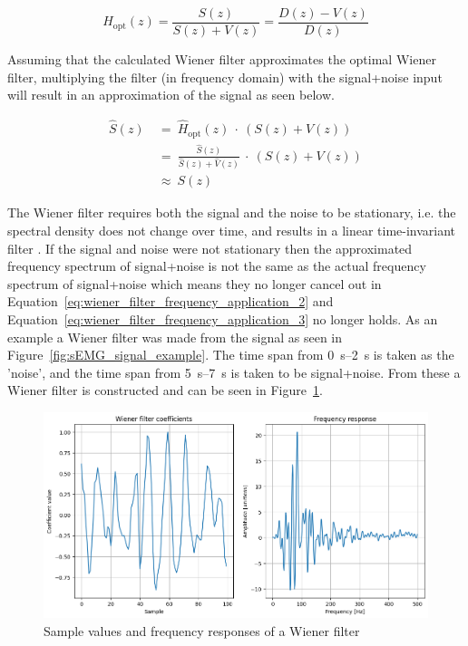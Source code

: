 \begin{equation}
    H_\text{opt}(z) = \frac{S(z)}{S(z) + V(z)} = \frac{D(z) - V(z)}{D(z)} 
    \label{eq:wiener_filter_frequency_behaviour}
\end{equation}

Assuming that the calculated Wiener filter approximates the optimal Wiener filter, multiplying the filter (in frequency domain) with the signal+noise input will result in an approximation of the signal as seen below.

\begin{align}
    \hat{S}(z) & \ = \ \hat{H}_\text{opt}(z) \ \cdot \ \left(S(z) + V(z)\right) \label{eq:wiener_filter_frequency_application_1} \\
    & \ = \ \frac{\hat{S}(z)}{\hat{S}(z) + \hat{V}(z)} \ \cdot \ \left(S(z) + V(z)\right) \label{eq:wiener_filter_frequency_application_2}\\
    & \ \approx \ S(z) \label{eq:wiener_filter_frequency_application_3}
\end{align}

The Wiener filter requires both the signal and the noise to be stationary, i.e. the spectral density does not change over time, and results in a linear time-invariant filter \cite{stationary_processes_definition} \cite{difference_stationary_nonstationary}. If the signal and noise were not stationary then the approximated frequency spectrum of signal+noise is not the same as the actual frequency spectrum of signal+noise which means they no longer cancel out in Equation~\ref{eq:wiener_filter_frequency_application_2} and Equation~\ref{eq:wiener_filter_frequency_application_3} no longer holds.
As an example a Wiener filter was made from the signal as seen in Figure~\ref{fig:sEMG_signal_example}. The time span from \SIrange{0}{2}{\second} is taken as the 'noise', and the time span from \SIrange{5}{7}{\second} is taken to be signal+noise. From these a Wiener filter is constructed and can be seen in Figure~\ref{fig:wiener_filter_response}.

\begin{figure}[h!t]
	\begin{center}
		\includegraphics[width=1.0\columnwidth]{images/wiener_filter_response.png}
	\end{center}
	\caption{Sample values and frequency responses of a Wiener filter}
	\label{fig:wiener_filter_response}
\end{figure}

